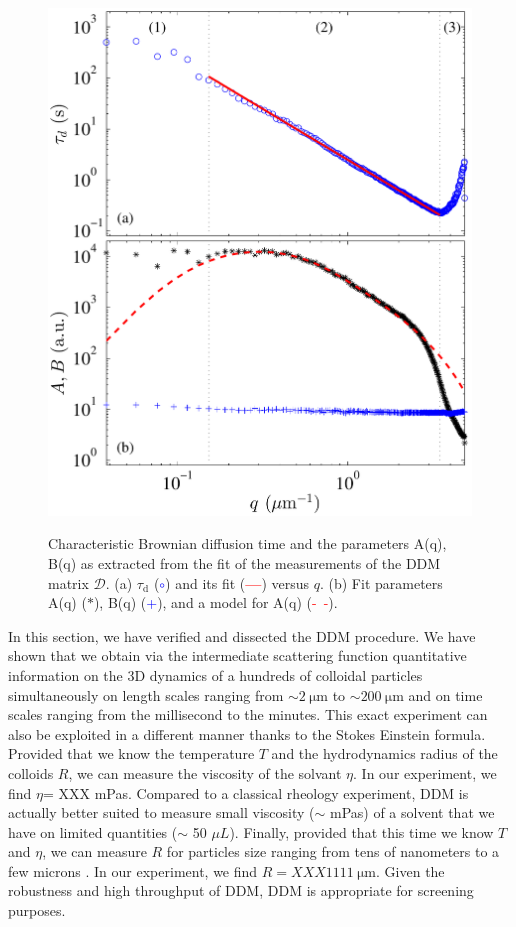 \documentclass[%
 aip,
 jmp,%
 amsmath,amssymb,
reprint,%
]{revtex4-1}
\newcommand{\tg}[1]{{\color{magenta}#1}} %
\begin{document}
\begin{figure}
	\includegraphics[width=\linewidth]{DiffusionColloids.pdf}\\
	\caption{Characteristic Brownian diffusion time and the parameters A(q), B(q) \tg{as extracted from the fit of the measurements of the DDM matrix $\mathcal{D}$}. (a) $\tau_\text{d}$ (\textcolor{blue}{$\circ$}) and its fit (\textcolor{red}{\textbf{---}}) versus $q$. (b) Fit parameters A(q) ($\ast$), B(q) (\textcolor{blue}{+}), and a model\citep{3_DDM3D} for A(q) (\textcolor{red}{-~-}). }
	\label{FitDiffColl}
\end{figure}

In this section, we have verified and dissected the DDM procedure. We have shown that we obtain via the intermediate scattering function quantitative information on the 3D dynamics of a hundreds of colloidal particles simultaneously on length scales ranging from $\sim \SI{2}{\micro\meter}$ to $\sim \SI{200}{\micro\meter}$ and on time scales ranging from the millisecond to the minutes. This exact experiment can also be exploited in a different manner thanks to the Stokes Einstein formula. Provided  that we know the temperature $T$ and the hydrodynamics radius of the colloids $R$, we can measure the viscosity of the solvant $\eta$. \tg{In our experiment, we find $\eta$= XXX mPas}. Compared to a classical rheology experiment, DDM is actually better suited to measure small viscosity ($\sim$ mPas) of a solvent that we have on limited quantities ($\sim$ 50 $\mu L$). Finally, provided that this time we know $T$ and $\eta$, we can measure $R$ for particles size ranging from tens of nanometers to a few microns \cite{2_DDM}.  \tg{In our experiment, we find $R= XXX\SI{1111}{\micro\meter}$}. Given the robustness and high throughput of DDM, DDM is appropriate for screening purposes.
\end{document}
